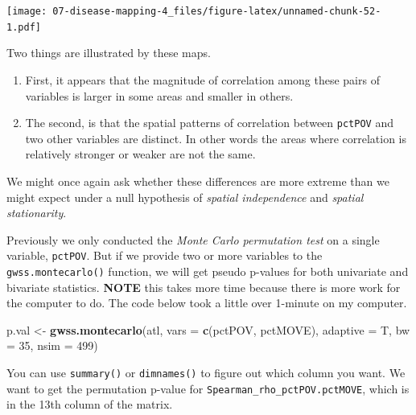 \documentclass[
]{book}
\newenvironment{Shaded}{\begin{snugshade}}{\end{snugshade}}
\newcommand{\AttributeTok}[1]{\textcolor[rgb]{0.13,0.29,0.53}{#1}}
\newcommand{\DecValTok}[1]{\textcolor[rgb]{0.00,0.00,0.81}{#1}}
\newcommand{\FunctionTok}[1]{\textcolor[rgb]{0.13,0.29,0.53}{\textbf{#1}}}
\newcommand{\NormalTok}[1]{#1}
\newcommand{\OtherTok}[1]{\textcolor[rgb]{0.56,0.35,0.01}{#1}}
\newcommand{\StringTok}[1]{\textcolor[rgb]{0.31,0.60,0.02}{#1}}
\providecommand{\tightlist}{%
  \setlength{\itemsep}{0pt}\setlength{\parskip}{0pt}}
\begin{document}
\texttt{[image: 07-disease-mapping-4\_files/figure-latex/unnamed-chunk-52-1.pdf]}

Two things are illustrated by these maps.

\begin{enumerate}
\def\labelenumi{\arabic{enumi}.}
\tightlist
\item
  First, it appears that the magnitude of correlation among these pairs of variables is larger in some areas and smaller in others.
\item
  The second, is that the spatial patterns of correlation between \texttt{pctPOV} and two other variables are distinct. In other words the areas where correlation is relatively stronger or weaker are not the same.
\end{enumerate}

We might once again ask whether these differences are more extreme than we might expect under a null hypothesis of \emph{spatial independence} and \emph{spatial stationarity}.

Previously we only conducted the \emph{Monte Carlo permutation test} on a single variable, \texttt{pctPOV}. But if we provide two or more variables to the \texttt{gwss.montecarlo()} function, we will get pseudo p-values for both univariate and bivariate statistics. \textbf{NOTE} this takes more time because there is more work for the computer to do. The code below took a little over 1-minute on my computer.

\begin{Shaded}
\begin{Highlighting}[]
\NormalTok{p.val }\OtherTok{\textless{}{-}} \FunctionTok{gwss.montecarlo}\NormalTok{(atl, }\AttributeTok{vars =} \FunctionTok{c}\NormalTok{(}\StringTok{\textquotesingle{}pctPOV\textquotesingle{}}\NormalTok{, }\StringTok{\textquotesingle{}pctMOVE\textquotesingle{}}\NormalTok{), }
                         \AttributeTok{adaptive =}\NormalTok{ T,}
                         \AttributeTok{bw =} \DecValTok{35}\NormalTok{,}
                         \AttributeTok{nsim =} \DecValTok{499}\NormalTok{)}
\end{Highlighting}
\end{Shaded}

You can use \texttt{summary()} or \texttt{dimnames()} to figure out which column you want. We want to get the permutation p-value for \texttt{Spearman\_rho\_pctPOV.pctMOVE}, which is in the 13th column of the matrix.
\end{document}
